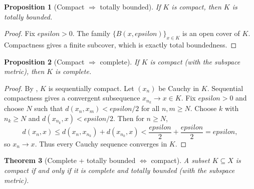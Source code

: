 \documentclass[12pt]{article}
\numberwithin{equation}{section}
\def\eps{epsilon}
\newcommand{\eps}{\varepsilon}               %
\theoremstyle{plain}
\newtheorem{theorem}{Theorem}[section]
\newtheorem{proposition}[theorem]{Proposition}
\theoremstyle{definition}
\theoremstyle{remark}
\begin{document}
\begin{proposition}[Compact $\Rightarrow$ totally bounded]\label{ms:prop:compact-totally-bounded}
If $K$ is compact, then $K$ is totally bounded.
\end{proposition}

\begin{proof}
Fix $\eps>0$. The family $\{B(x,\eps)\}_{x\in K}$ is an open cover of $K$.
Compactness gives a finite subcover, which is exactly total boundedness.
\end{proof}

\begin{proposition}[Compact $\Rightarrow$ complete]\label{ms:prop:compact-complete}
If $K$ is compact (with the subspace metric), then $K$ is complete.
\end{proposition}

\begin{proof}
By , $K$ is sequentially compact.
Let $(x_n)$ be Cauchy in $K$. Sequential compactness gives a convergent subsequence $x_{n_k}\to x\in K$.
Fix $\eps>0$ and choose $N$ such that $d(x_n,x_m)<\eps/2$ for all $n,m\ge N$.
Choose $k$ with $n_k\ge N$ and $d(x_{n_k},x)<\eps/2$. Then for $n\ge N$,
\[
d(x_n,x)\le d(x_n,x_{n_k})+d(x_{n_k},x)<\frac{\eps}{2}+\frac{\eps}{2}=\eps,
\]
so $x_n\to x$. Thus every Cauchy sequence converges in $K$.
\end{proof}

\begin{theorem}[Complete + totally bounded $\Longleftrightarrow$ compact]\label{ms:thm:complete-totally-bounded}
A subset $K\subseteq X$ is compact if and only if it is complete and totally bounded (with the subspace metric).
\end{theorem}
\end{document}
